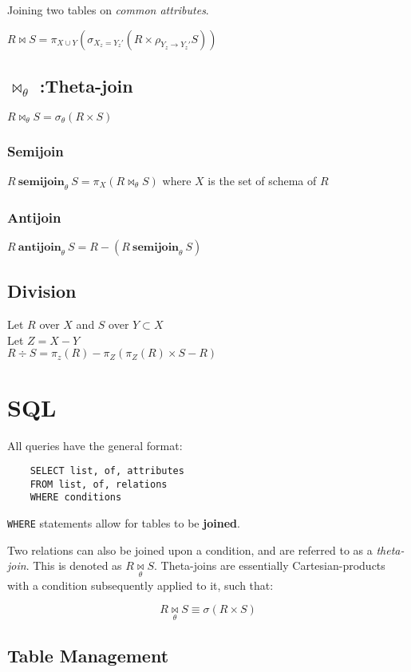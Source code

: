 \documentclass{article}
\begin{document}
Joining two tables on \textit{common attributes}.

$ R \Join S = \pi_{X\cup Y}(\sigma_{X_z = Y_z'}(R \times \rho_{Y_z \rightarrow Y_z'} S))$

\subsection*{$\Join_\theta$ :Theta-join}
$R \Join_\theta S = \sigma_\theta(R\times S)$

\subsubsection*{Semijoin}
$R \:\textbf{semijoin}_\theta\: S = \pi_{X} (R \Join_\theta S)$ where $X$ is the set of schema of $R$

\subsubsection*{Antijoin}
$R \:\textbf{antijoin}_\theta\: S = R - (R \:\textbf{semijoin}_\theta\: S)$

\subsection*{Division}
Let $R$ over $X$ and $S$ over $Y \subset X$ \\
Let $Z = X-Y$\\
$R \div S = \pi_z(R) - \pi_Z(\pi_Z(R) \times S - R)$

\section{SQL}

All queries have the general format:

\begin{lstlisting}
    SELECT list, of, attributes
    FROM list, of, relations
    WHERE conditions
\end{lstlisting}

\texttt{WHERE} statements allow for tables to be \textbf{joined}.

Two relations can also be joined upon a condition, and are referred to as a \textit{theta-join}. This is denoted as $R \underset{\theta}{\Join} S$. Theta-joins are essentially Cartesian-products with a condition subsequently applied to it, such that:

\[ R \underset{\theta}{\Join} S \equiv \sigma(R \times S) \]

\subsection{Table Management}
\end{document}
